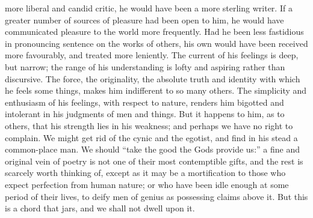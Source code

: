 more liberal and candid critic, he would have been a more sterling
writer. If a greater number of sources of pleasure had been open
to him, he would have communicated pleasure to the world more
frequently. Had he been less fastidious in pronouncing sentence on
the works of others, his own would have been received more
favourably, and treated more leniently.  The current of his
feelings is deep, but narrow; the range of his understanding is
lofty and aspiring rather than discursive. The force, the
originality, the absolute truth and identity with which he feels
some things, makes him indifferent to so many others. The
simplicity and enthusiasm of his feelings, with respect to nature,
renders him bigotted and intolerant in his judgments of men and
things. But it happens to him, as to others, that his strength
lies in his weakness; and perhaps we have no right to complain. We
might get rid of the cynic and the egotist, and find in his stead
a common-place man. We should ``take the good the Gods provide
us:'' a fine and original vein of poetry is not one of their most
contemptible gifts, and the rest is scarcely worth thinking of,
except as it may be a mortification to those who expect perfection
from human nature; or who have been idle enough at some period of
their lives, to deify men of genius as possessing claims above
it. But this is a chord that jars, and we shall not dwell upon it.

